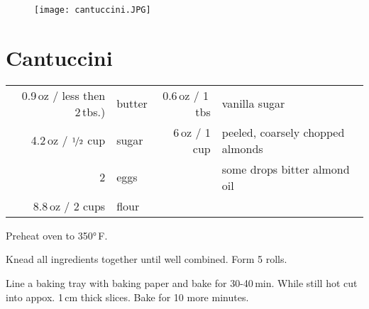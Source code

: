 \begin{figure}[H]
  \centering
  \texttt{[image: cantuccini.JPG]}
\end{figure}
\section{Cantuccini}
\begin{centering}

\end{centering}
\begin{table}[H]
\centering
\begin{tabular*}{1\textwidth}{rlrl}
0.9\,oz / less then 2\,tbs.) & butter & 0.6\,oz / 1\,tbs & vanilla sugar \\
4.2\,oz / $\nicefrac{1}{2}$ cup & sugar & 6\,oz / 1 cup & peeled, coarsely chopped almonds \\
2 & eggs & & some drops bitter almond oil \\
8.8\,oz / 2 cups  & flour & & \\
\end{tabular*}
\end{table}
\begin{Notes}
\item Preheat oven to 350°\,F.
\item Knead all ingredients together until well combined. Form 5 rolls.
\item Line a baking tray with baking paper and bake for 30-40\,min. While still hot cut into appox. 1\,cm thick slices. Bake for 10 more minutes.
\end{Notes}
\vfill
\newpage


